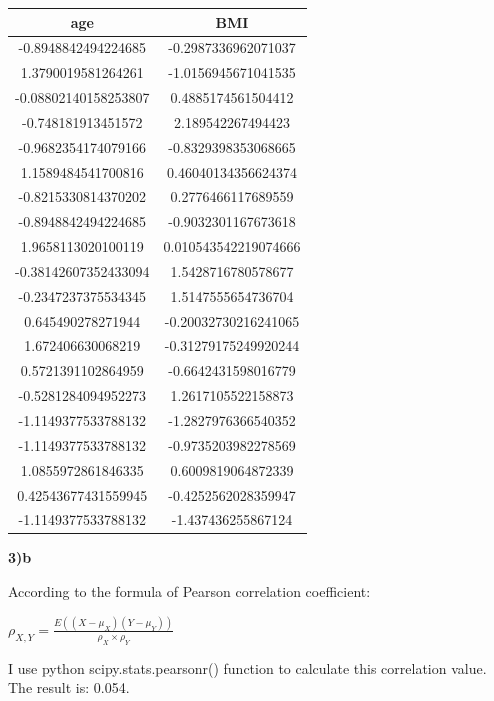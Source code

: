\documentclass{article}
\begin{document}
\begin{center}
\begin{tabular}{c | c}
age & BMI \\
\hline
-0.8948842494224685  &  -0.2987336962071037  \\
1.3790019581264261  &  -1.0156945671041535  \\
-0.08802140158253807  &  0.4885174561504412  \\
-0.748181913451572  &  2.189542267494423  \\
-0.9682354174079166  &  -0.8329398353068665  \\
1.1589484541700816  &  0.46040134356624374  \\
-0.8215330814370202  &  0.2776466117689559  \\
-0.8948842494224685  &  -0.9032301167673618  \\
1.9658113020100119  &  0.010543542219074666  \\
-0.38142607352433094  &  1.5428716780578677  \\
-0.2347237375534345  &  1.5147555654736704  \\
0.645490278271944  &  -0.20032730216241065  \\
1.672406630068219  &  -0.31279175249920244  \\
0.5721391102864959  &  -0.6642431598016779  \\
-0.5281284094952273  &  1.2617105522158873  \\
-1.1149377533788132  &  -1.2827976366540352  \\
-1.1149377533788132  &  -0.9735203982278569  \\
1.0855972861846335  &  0.6009819064872339  \\
0.42543677431559945  &  -0.4252562028359947  \\
-1.1149377533788132  &  -1.437436255867124
\end{tabular}
\end{center}

\bigskip

\textbf{3)b}

According to the formula of Pearson correlation coefficient:

\begin{center}
    $\rho_{X,Y} = \frac{E((X-\mu_X)(Y-\mu_Y))}{\rho_X \times \rho_Y}$
\end{center}

I use python scipy.stats.pearsonr() function to calculate this correlation value. The result is: 0.054.

\bigskip
\end{document}
